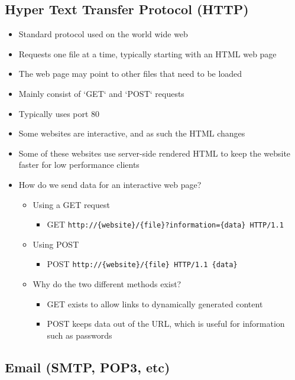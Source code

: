 
\subsection*{Hyper Text Transfer Protocol (HTTP)}

\begin{itemize}
  \item Standard protocol used on the world wide web
  \item Requests one file at a time, typically starting with an HTML web page
  \item The web page may point to other files that need to be loaded
  \item Mainly consist of `GET` and `POST` requests
  \item Typically uses port 80
  \item Some websites are interactive, and as such the HTML changes
  \item Some of these websites use server-side rendered HTML to keep the website faster for low performance clients
  \item How do we send data for an interactive web page?
  \begin{itemize}
    \item Using a GET request
    \begin{itemize}
      \item GET \verb|http://{website}/{file}?information={data} HTTP/1.1|
    \end{itemize}
    \item Using POST
    \begin{itemize}
      \item POST \verb|http://{website}/{file} HTTP/1.1 {data}|
    \end{itemize}
    \item Why do the two different methods exist?
    \begin{itemize}
      \item GET exists to allow links to dynamically generated content
      \item POST keeps data out of the URL, which is useful for information such as passwords
    \end{itemize}
  \end{itemize}
\end{itemize}


\subsection*{Email (SMTP, POP3, etc)}

